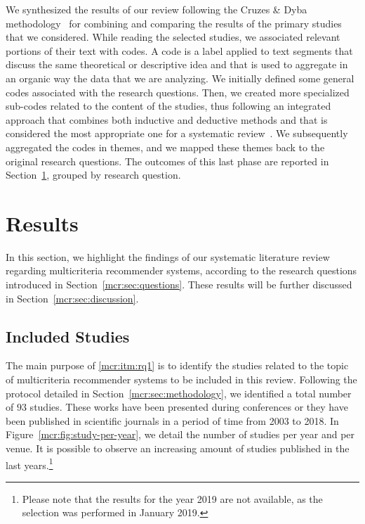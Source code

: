 We synthesized the results of our review following the Cruzes \& Dyba methodology~\cite{Cruzes2011} for combining and comparing the results of the primary studies that we considered. While reading the selected studies, we associated relevant portions of their text with codes. A code is a label applied to text segments that discuss the same theoretical or descriptive idea and that is used to aggregate in an organic way the data that we are analyzing. We initially defined some general codes associated with the research questions. Then, we created more specialized sub-codes related to the content of the studies, thus following an integrated approach that combines both inductive and deductive methods and that is considered the most appropriate one for a systematic review~\cite{Cruzes2011}. We subsequently aggregated the codes in themes, and we mapped these themes back to the original research questions. The outcomes of this last phase are reported in Section~\ref{mcr:sec:results}, grouped by research question.

\section{Results}
\label{mcr:sec:results}

In this section, we highlight the findings of our systematic literature review regarding multicriteria recommender systems, according to the research questions introduced in Section~\ref{mcr:sec:questions}. These results will be further discussed in Section~\ref{mcr:sec:discussion}.

\subsection{Included Studies}
\label{mcr:sec:included}

The main purpose of \ref{mcr:itm:rq1} is to identify the studies related to the topic of multicriteria recommender systems to be included in this review. Following the protocol detailed in Section~\ref{mcr:sec:methodology}, we identified a total number of $93$ studies. These works have been presented during conferences or they have been published in scientific journals in a period of time from 2003 to 2018. In Figure~\ref{mcr:fig:study-per-year}, we detail the number of studies per year and per venue. It is possible to observe an increasing amount of studies published in the last years.\footnote{Please note that the results for the year 2019 are not available, as the selection was performed in January 2019.}


